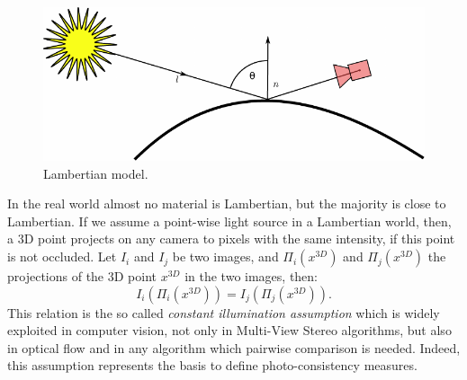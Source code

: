 \begin{figure}[t]
\includegraphics[width=0.99\columnwidth]{./img/ch_soa/lambert}
 \caption{Lambertian model.} 
\label{fig:lamber}
\end{figure}

In the real world almost no material is Lambertian, but the majority is close to Lambertian.
If we assume a point-wise light source in a Lambertian world, then, a 3D point projects on any camera to pixels with the same intensity, if this point is not occluded. 
Let $I_i$ and $I_j$ be two images, and $\Pi_i(x^{3D})$ and  $\Pi_j(x^{3D})$ the projections of the 3D point $x^{3D}$ in the two images, then:
\begin{equation}
 \label{eq:const_bright} 
 I_i(\Pi_i(x^{3D})) = I_j(\Pi_j(x^{3D})).
\end{equation}
This relation is the so called \emph{constant illumination assumption} which is widely exploited in computer vision, not only in Multi-View Stereo algorithms, but also in optical flow and in  any algorithm which pairwise comparison is needed.
Indeed, this assumption represents the basis to define photo-consistency measures.


